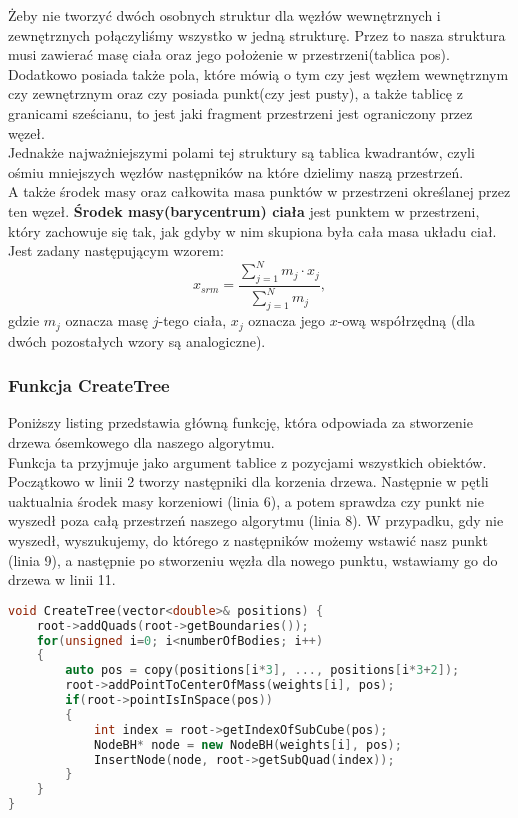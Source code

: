\documentclass[14pt,twoside,a4paper]{article}
\theoremstyle{definition}
\begin{document}
Żeby nie tworzyć dwóch osobnych struktur dla węzłów wewnętrznych i zewnętrznych połączyliśmy wszystko w jedną strukturę. Przez to nasza struktura musi zawierać masę ciała oraz jego położenie w przestrzeni(tablica pos). Dodatkowo posiada także pola, które mówią o tym czy jest węzłem wewnętrznym czy zewnętrznym oraz czy posiada punkt(czy jest pusty), a także tablicę z granicami sześcianu, to jest jaki fragment przestrzeni jest ograniczony przez węzeł.\\
\bigskip
Jednakże najważniejszymi polami tej struktury są tablica kwadrantów, czyli ośmiu mniejszych węzłów następników na które dzielimy naszą przestrzeń. \\ A także środek masy oraz całkowita masa punktów w przestrzeni określanej przez ten węzeł. 
\textbf{Środek masy(barycentrum) ciała}  jest punktem w przestrzeni, który zachowuje się tak, jak gdyby w nim skupiona była cała masa układu ciał. Jest zadany następującym wzorem:
$$ x_{srm} = \frac{\sum_{j=1}^N m_j\cdot x_j}{\sum_{j=1}^N m_j},$$ gdzie $m_j$ oznacza masę $j$-tego ciała, $x_j$ oznacza jego $x$-ową współrzędną (dla dwóch pozostałych wzory są analogiczne). \\

\subsubsection{\large Funkcja CreateTree}
Poniższy listing przedstawia główną funkcję, która odpowiada za stworzenie drzewa ósemkowego dla naszego algorytmu.\\ 
\bigskip
Funkcja ta przyjmuje jako argument tablice z pozycjami wszystkich obiektów. 
Początkowo w linii 2 tworzy następniki dla korzenia drzewa. Następnie w pętli uaktualnia środek masy korzeniowi (linia 6), a potem sprawdza czy punkt nie wyszedł poza całą przestrzeń naszego algorytmu (linia 8). W przypadku, gdy nie wyszedł, wyszukujemy, do którego z następników możemy wstawić nasz punkt (linia 9), a następnie po stworzeniu węzła dla nowego punktu, wstawiamy go do drzewa w linii 11.
\bigskip

\begin{lstlisting}[language=C++, frame=single, framerule=2pt, caption=Pseudokod algorytmu tworzenia drzewa ósemkowego]
void CreateTree(vector<double>& positions) {
    root->addQuads(root->getBoundaries());
    for(unsigned i=0; i<numberOfBodies; i++)
    {	
    	auto pos = copy(positions[i*3], ..., positions[i*3+2]);	        
        root->addPointToCenterOfMass(weights[i], pos);
        if(root->pointIsInSpace(pos)) 
        {
            int index = root->getIndexOfSubCube(pos);
            NodeBH* node = new NodeBH(weights[i], pos);
            InsertNode(node, root->getSubQuad(index));
        }
    }
}
\end{lstlisting}
\end{document}
